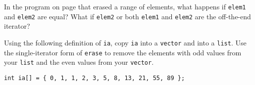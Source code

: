 %
%
\begin{question}
In the program on page \pageref{lst:delete the range of elements} that erased a range of elements, what happens if \verb|elem1| and \verb|elem2| are equal? What if \verb|elem2| or both \verb|elem1| and \verb|elem2| are the off-the-end iterator?
\end{question}

\begin{question}
Using the following definition of \verb|ia|, copy \verb|ia| into a \verb|vector|
and into a \verb|list|. Use the single-iterator form of \verb|erase| to remove the
elements with odd values from your \verb|list| and the even values from your
\verb|vector|.
\begin{lstlisting}
int ia[] = { 0, 1, 1, 2, 3, 5, 8, 13, 21, 55, 89 };
\end{lstlisting}
\end{question}
